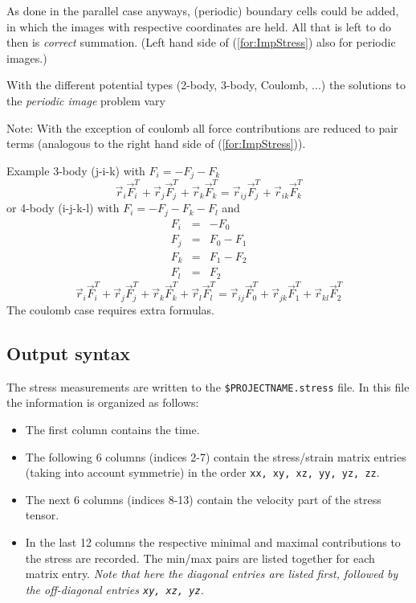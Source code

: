As done in the parallel case anyways, (periodic) boundary cells could be added, in which the images with respective coordinates are held. All that is left to do then is \textit{correct} summation. (Left hand side of (\ref{for:ImpStress}) also for periodic images.)

With the different potential types (2-body, 3-body, Coulomb, ...) the solutions to the \textit{periodic image} problem vary

Note:
With the exception of coulomb all force contributions are reduced to pair terms (analogous to the right hand side of (\ref{for:ImpStress})). 

Example 3-body (j-i-k) with \( F_i = -F_j -F_k \)
\begin{equation*}
   \vec{r}_{i}\vec{F}_{i}^T+\vec{r}_{j}\vec{F}_{j}^T+\vec{r}_{k}\vec{F}_{k}^T = \vec{r}_{ij}\vec{F}_{j}^T+\vec{r}_{ik}\vec{F}_{k}^T
\end{equation*}
or 4-body (i-j-k-l) with \(F_i=-F_j-F_k-F_l\) and
\begin{eqnarray*}
  F_i & = & -F_0 \\
  F_j & = & F_0-F_1 \\
  F_k & = & F_1-F_2 \\
  F_l & = & F_2
\end{eqnarray*}
\begin{equation*}
  \vec{r}_{i}\vec{F}_{i}^T+\vec{r}_{j}\vec{F}_{j}^T+\vec{r}_{k}\vec{F}_{k}^T+\vec{r}_{l}\vec{F}_{l}^T = \vec{r}_{ij}\vec{F}_{0}^T+\vec{r}_{jk}\vec{F}_{1}^T+\vec{r}_{kl}\vec{F}_{2}^T
\end{equation*}
The coulomb case requires extra formulas.

\subsection{Output syntax}
The stress measurements are written to the \texttt{\$PROJECTNAME.stress} file. In this file the information is organized as follows:
\begin{itemize}
\item The first column contains the time.
\item The following 6 columns (indices 2-7) contain the stress/strain matrix entries (taking into account symmetrie) in the order \texttt{xx, xy, xz, yy, yz, zz}. 
\item The next 6 columns (indices 8-13) contain the velocity part of the stress tensor.
\item In the last 12 columns the respective minimal and maximal contributions to the stress are recorded. The min/max pairs are listed together for each matrix entry. 
\emph{Note that here the diagonal entries are listed first, followed by the off-diagonal entries \texttt{xy, xz, yz}.}
\end{itemize}

